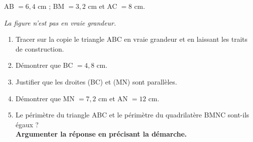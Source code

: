 \documentclass[exercice,a4]{thedocument}%
\begin{document}
AB $= 6,4$ cm ; BM $= 3,2$ cm et AC $= 8$ cm.

\emph{La figure n'est pas en vraie grandeur.}

\begin{enumerate}
\item Tracer sur la copie le triangle ABC en vraie grandeur et en laissant les traits de construction.
\item Démontrer que BC $= 4,8$ cm.
\item Justifier que les droites (BC) et (MN) sont parallèles.
\item Démontrer que MN $= 7,2$ cm et AN $= 12$ cm.
\item Le périmètre du triangle ABC et le périmètre du quadrilatère BMNC sont-ils égaux ?\\
\textbf{Argumenter la réponse en précisant la démarche.}
\end{enumerate}

\medskip
\showthesource
\end{document}
